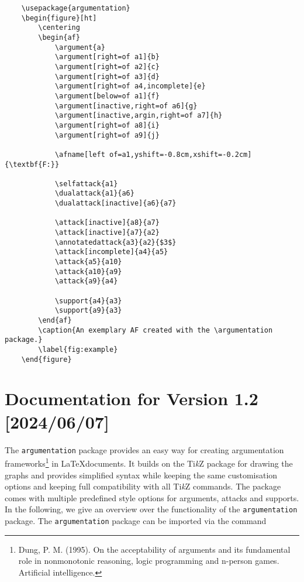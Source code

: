 \documentclass{article}
\newcommand{\tikzname}{Ti\emph{k}Z\xspace}
\newcommand{\argumentation}{\texttt{argumentation}\xspace}
\begin{document}
\begin{verbatim}
    \usepackage{argumentation}
    \begin{figure}[ht]
        \centering
        \begin{af}
            \argument{a}
            \argument[right=of a1]{b}
            \argument[right=of a2]{c}
            \argument[right=of a3]{d}
            \argument[right=of a4,incomplete]{e}
            \argument[below=of a1]{f}
            \argument[inactive,right=of a6]{g}
            \argument[inactive,argin,right=of a7]{h}
            \argument[right=of a8]{i}
            \argument[right=of a9]{j}
    
            \afname[left of=a1,yshift=-0.8cm,xshift=-0.2cm]{\textbf{F:}}
    
            \selfattack{a1}
            \dualattack{a1}{a6}
            \dualattack[inactive]{a6}{a7}
            
            \attack[inactive]{a8}{a7}
            \attack[inactive]{a7}{a2}
            \annotatedattack{a3}{a2}{$3$}
            \attack[incomplete]{a4}{a5}
            \attack{a5}{a10}
            \attack{a10}{a9}
            \attack{a9}{a4}

            \support{a4}{a3}
            \support{a9}{a3}
        \end{af}
        \caption{An exemplary AF created with the \argumentation package.}
        \label{fig:example}
    \end{figure}
\end{verbatim}

\newpage\section{Documentation for Version 1.2 [2024/06/07]}\label{sec:documentation}

The \argumentation package provides an easy way for creating argumentation frameworks\footnote{Dung, P. M. (1995). On the acceptability of arguments and its fundamental role in nonmonotonic reasoning, logic programming and n-person games. Artificial intelligence.} in \LaTeX documents.
It builds on the \tikzname package for drawing the graphs and provides simplified syntax while keeping the same customisation options and keeping full compatibility with all \tikzname commands.
The package comes with multiple predefined style options for arguments, attacks and supports.
In the following, we give an overview over the functionality of the \argumentation package.
The \argumentation package can be imported via the command
    
\end{document}
